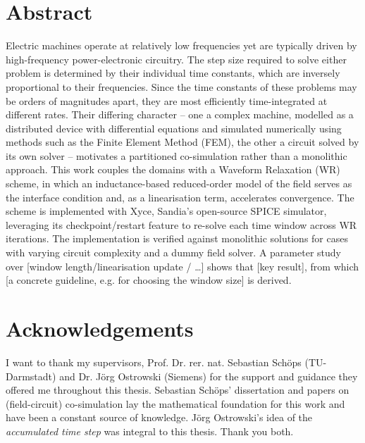 
\section*{Abstract}
Electric machines operate at relatively low frequencies yet are typically driven by high-frequency power-electronic circuitry. The step size required to solve either problem is determined by their individual time constants, which are inversely proportional to their frequencies. Since the time constants of these problems may be orders of magnitudes apart, they are most efficiently time-integrated at different rates. Their differing character – one a complex machine, modelled as a distributed device with differential equations and simulated numerically using methods such as the Finite Element Method (FEM), the other a circuit solved by its own solver – motivates a partitioned co-simulation rather than a monolithic approach. This work couples the domains with a Waveform Relaxation (WR) scheme, in which an inductance-based reduced-order model of the field serves as the interface condition and, as a linearisation term, accelerates convergence. The scheme is implemented with Xyce, Sandia's open-source SPICE simulator, leveraging its checkpoint/restart feature to re-solve each time window across WR iterations. The implementation is verified against monolithic solutions for cases with varying circuit complexity and a dummy field solver. A parameter study over [window length/linearisation update / …] shows that [key result], from which [a concrete guideline, e.g. for choosing the window size] is derived.


\section*{Acknowledgements}
I want to thank my supervisors, Prof. Dr. rer. nat. Sebastian Schöps (TU-Darmstadt) and Dr. Jörg Ostrowski (Siemens) for the support and guidance they offered me throughout this thesis.
Sebastian Schöps' dissertation and papers on (field-circuit) co-simulation lay the mathematical foundation for this work and have been a constant source of knowledge.
Jörg Ostrowski's idea of the \textit{accumulated time step} was integral to this thesis.
Thank you both.

